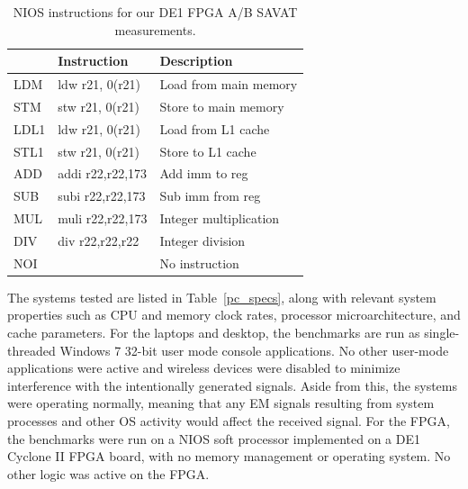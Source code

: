 \begin{table}[htbp]%
  \small%
  \centering%
    \begin{tabular}{lll}%
    \toprule
    & \textbf{Instruction} & \textbf{Description} \\
    \midrule
    LDM  & ldw  r21, 0(r21) & Load from main memory \\
    STM  & stw  r21, 0(r21) & Store to main memory  \\
    LDL1 & ldw  r21, 0(r21) & Load from L1 cache    \\
    STL1 & stw  r21, 0(r21) & Store to L1 cache     \\
    ADD  & addi r22,r22,173 & Add imm to reg  \\
    SUB  & subi r22,r22,173 & Sub imm from reg \\
    MUL  & muli r22,r22,173 & Integer multiplication \\
    DIV  & div  r22,r22,r22 & Integer division       \\
    NOI  &                  & No instruction \\
    \bottomrule
    \end{tabular}%
  \caption{NIOS instructions for our DE1 FPGA A/B SAVAT measurements.}%
  \label{nios_insts}%
\end{table}%

The systems tested are listed in Table~\ref{pc_specs}, along with relevant system properties such as CPU and memory clock rates, processor microarchitecture, and cache parameters. For the laptops and desktop, the benchmarks are run as single-threaded Windows 7 32-bit user mode console applications. No other user-mode applications were active and wireless devices were disabled to minimize interference with the intentionally generated signals. Aside from this, the systems were operating normally, meaning that any EM signals resulting from system processes and other OS activity would affect the received signal. For the FPGA, the benchmarks were run on a NIOS soft processor implemented on a DE1 Cyclone II FPGA board, with no memory management or operating system. No other logic was active on the FPGA. 

